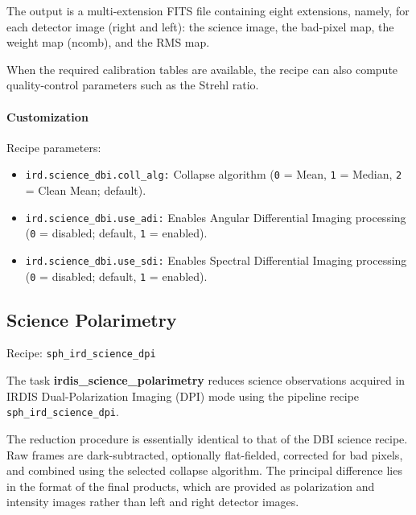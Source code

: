 The output is a multi-extension FITS file containing eight extensions, namely, for each detector image (right and left): the science image, the bad-pixel map, the weight map (ncomb), and the RMS map.

When the required calibration tables are available, the recipe can also compute quality-control parameters such as the Strehl ratio.

\paragraph{Customization}

Recipe parameters:

\begin{itemize}

\item \texttt{ird.science\_dbi.coll\_alg:}
Collapse algorithm
(\texttt{0} = Mean,
 \texttt{1} = Median,
 \texttt{2} = Clean Mean; default).

\item \texttt{ird.science\_dbi.use\_adi:}
Enables Angular Differential Imaging processing
(\texttt{0} = disabled; default,
 \texttt{1} = enabled).

\item \texttt{ird.science\_dbi.use\_sdi:}
Enables Spectral Differential Imaging processing
(\texttt{0} = disabled; default,
 \texttt{1} = enabled).

\end{itemize}

\subsection{Science Polarimetry}

Recipe: \texttt{sph\_ird\_science\_dpi}

The task \textbf{irdis\_science\_polarimetry} reduces science observations
acquired in IRDIS Dual-Polarization Imaging (DPI) mode using the pipeline
recipe \texttt{sph\_ird\_science\_dpi}.

The reduction procedure is essentially identical to that of the DBI science
recipe. Raw frames are dark-subtracted, optionally flat-fielded, corrected for
bad pixels, and combined using the selected collapse algorithm. The principal
difference lies in the format of the final products, which are provided as
polarization and intensity images rather than left and right detector images.

